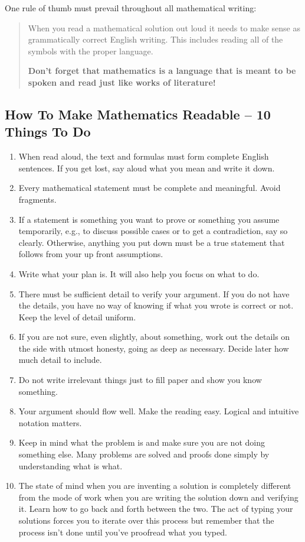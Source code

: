\documentclass[
]{book}
\theoremstyle{definition}
\theoremstyle{definition}
\theoremstyle{definition}
\theoremstyle{remark}
\begin{document}
One rule of thumb must prevail throughout all mathematical writing:

\begin{quote}
When you read a mathematical solution out loud it needs to make sense
as grammatically correct English writing. This includes reading all of
the symbols with the proper language.

\textbf{Don't forget that mathematics is a language that is meant to be
spoken and read just like works of literature!}
\end{quote}

\hypertarget{how-to-make-mathematics-readable-10-things-to-do}{%
\subsection{How To Make Mathematics Readable -- 10 Things To Do}\label{how-to-make-mathematics-readable-10-things-to-do}}

\begin{enumerate}
\def\labelenumi{\arabic{enumi}.}
\item
  When read aloud, the text and formulas must form complete English
  sentences. If you get lost, say aloud what you mean and write it
  down.
\item
  Every mathematical statement must be complete and meaningful. Avoid
  fragments.
\item
  If a statement is something you want to prove or something you
  assume temporarily, e.g., to discuss possible cases or to get a
  contradiction, say so clearly. Otherwise, anything you put down must
  be a true statement that follows from your up front assumptions.
\item
  Write what your plan is. It will also help you focus on what to do.
\item
  There must be sufficient detail to verify your argument. If you do
  not have the details, you have no way of knowing if what you wrote
  is correct or not. Keep the level of detail uniform.
\item
  If you are not sure, even slightly, about something, work out the
  details on the side with utmost honesty, going as deep as necessary.
  Decide later how much detail to include.
\item
  Do not write irrelevant things just to fill paper and show you know
  something.
\item
  Your argument should flow well. Make the reading easy. Logical and
  intuitive notation matters.
\item
  Keep in mind what the problem is and make sure you are not doing
  something else. Many problems are solved and proofs done simply by
  understanding what is what.
\item
  The state of mind when you are inventing a solution is completely
  different from the mode of work when you are writing the solution
  down and verifying it. Learn how to go back and forth between the
  two. The act of typing your solutions forces you to iterate over
  this process but remember that the process isn't done until you've
  proofread what you typed.
\end{enumerate}
\end{document}
